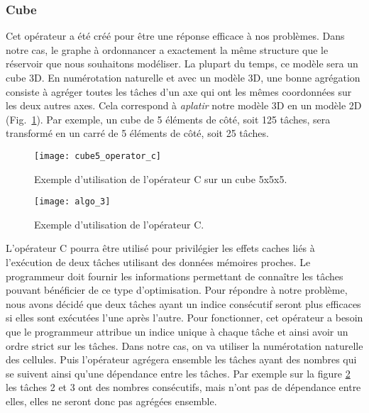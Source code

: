 \subsubsection{Cube}
Cet opérateur a été créé pour être une réponse efficace à nos problèmes.
%
Dans notre cas, le graphe à ordonnancer a exactement la même structure que le réservoir que nous souhaitons modéliser.
%
La plupart du temps, ce modèle sera un cube 3D.
%
En numérotation naturelle et avec un modèle 3D, une bonne agrégation consiste à agréger toutes les tâches d'un axe qui ont les mêmes coordonnées sur les deux autres axes.
%
Cela correspond à {\em aplatir} notre modèle 3D en un modèle 2D (Fig.~\ref{fig:cube5_algo_C}).
%
Par exemple, un cube de 5 éléments de côté, soit 125 tâches, sera transformé en un carré de 5 éléments de côté, soit 25 tâches.

\begin{figure}
  \centering
  \texttt{[image: cube5\_operator\_c]}
  \caption{Exemple d'utilisation de l'opérateur C sur un cube 5x5x5.}
  \label{fig:cube5_algo_C}
\end{figure}

\begin{figure}
  \centering
  \texttt{[image: algo\_3]}
  \caption{Exemple d'utilisation de l'opérateur C.}
  \label{fig:algo_C}
\end{figure}

L'opérateur C pourra être utilisé pour privilégier les effets caches liés à l'exécution de deux tâches utilisant des données mémoires proches.
%
Le programmeur doit fournir les informations permettant de connaître les tâches pouvant bénéficier de ce type d'optimisation.
%
Pour répondre à notre problème, nous avons décidé que deux tâches ayant un indice consécutif seront plus efficaces si elles sont exécutées l'une après l'autre.
%
Pour fonctionner, cet opérateur a besoin que le programmeur attribue un indice unique à chaque tâche et ainsi avoir un ordre strict sur les tâches.
%
Dans notre cas, on va utiliser la numérotation naturelle des cellules.
%
Puis l'opérateur agrégera ensemble les tâches ayant des nombres qui se suivent ainsi qu'une dépendance entre les tâches.
%
Par exemple sur la figure \ref{fig:algo_C} les tâches 2 et 3 ont des nombres consécutifs, mais n'ont pas de dépendance entre elles, elles ne seront donc pas agrégées ensemble.

